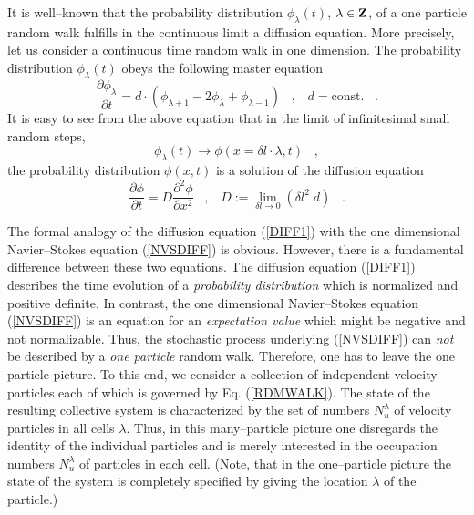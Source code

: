 It is well--known that the probability distribution
$\phi_{\lambda}(t)$, $\lambda \in {\bf{Z}}$,
of a one particle
random walk fulfills in the continuous limit a
diffusion equation. More precisely, let us consider a continuous
time
random walk in one dimension. The probability distribution
$\phi_{\lambda}(t)$ obeys the following master equation
\begin{equation}
\label{RDMWALK}
\frac{\partial \phi_{\lambda}}{\partial t} =
  d \cdot \left(
\phi_{\lambda+1} -2 \phi_{\lambda} + \phi_{\lambda-1}
 \right) \;\;\; , \;\;\; d=\mbox{const.} \;\;\; .
\end{equation}
It is easy to see from the above equation that in the limit
of infinitesimal
small random steps,
\begin{equation}
\phi_{\lambda}(t) \longrightarrow \phi(x=\delta l \cdot \lambda,t)
\;\;\; ,
\end{equation}
the probability distribution $\phi(x,t)$ is a solution of the
diffusion
equation
\begin{equation}
\label{DIFF1}
\frac{\partial \phi}{\partial t} = D
\frac{\partial^{2} \phi}{\partial x^{2}} \;\;\; , \;\;\; 
D:= {\lim}_{\delta l \rightarrow 0} \left( \delta l^2 \; d \right)
\;\;\; .
\end{equation}

The formal analogy of the diffusion equation (\ref{DIFF1}) with
the one
dimensional Navier--Stokes equation (\ref{NVSDIFF}) is obvious.
However, there is a fundamental difference between these two
equations.
The diffusion equation (\ref{DIFF1}) describes the time
evolution of a
{\em probability distribution} which is normalized and positive
definite.
In contrast, the one dimensional Navier--Stokes equation
(\ref{NVSDIFF})
is an equation for an {\em expectation value} which might be
negative and not
normalizable. Thus, the stochastic process
underlying (\ref{NVSDIFF}) can {\em not} be described by a
{\em one particle}
random walk.
Therefore, one has to leave the one particle picture. To this end,
we consider
a collection of independent velocity particles each of which is
governed by
Eq. (\ref{RDMWALK}). The state of the resulting collective system
\cite{KAMPEN} is characterized by the set of numbers $N_u^{\lambda}$
of velocity particles in all cells $\lambda$.
Thus, in this many--particle picture one disregards the identity of
the
individual particles and is merely interested in the occupation
numbers
$N_u^{\lambda}$ of particles in each cell.
(Note, that in the one--particle
picture the state of the system is completely specified by giving
the
location $\lambda$ of the particle.)

